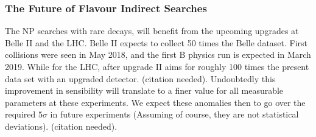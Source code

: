 \subsubsection{The Future of Flavour Indirect Searches}

The NP searches with rare decays, will benefit from the upcoming upgrades at Belle II and the LHC. Belle II expects to collect 50 times the Belle dataset. First collisions were seen in May 2018, and the first B physics run is expected in March 2019. While for the LHC, after upgrade II aims for roughly 100 times the present data set with an upgraded detector. {\color{blue} (citation needed)}.
%
Undoubtedly this improvement in sensibility will translate to a finer value for all measurable parameters at these experiments. We expect these anomalies then to go over the required $5 \sigma$ in future experiments (Assuming of course, they are not statistical deviations). {\color{blue} (citation needed)}.

